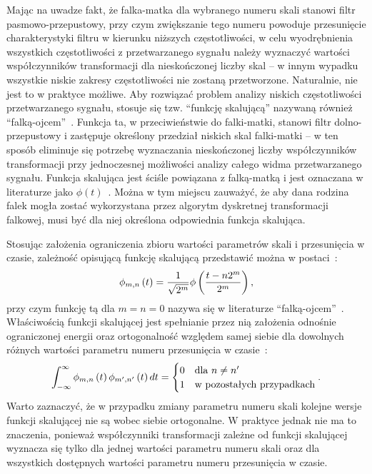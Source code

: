 Mając na uwadze fakt, że falka-matka dla wybranego numeru skali stanowi filtr pasmowo-przepustowy, przy czym zwiększanie tego numeru powoduje przesunięcie charakterystyki filtru w kierunku niższych częstotliwości, w celu wyodrębnienia wszystkich częstotliwości z przetwarzanego sygnału należy wyznaczyć wartości współczynników transformacji dla nieskończonej liczby skal -- w innym wypadku wszystkie niskie zakresy częstotliwości nie zostaną przetworzone. Naturalnie, nie jest to w praktyce możliwe. Aby rozwiązać problem analizy niskich częstotliwości przetwarzanego sygnału, stosuje się tzw. \enquote{funkcję skalującą} nazywaną również \enquote{falką-ojcem}~\cite{shensa_dwt}. Funkcja ta, w przeciwieństwie do falki-matki, stanowi filtr dolno-przepustowy i zastępuje określony przedział niskich skal falki-matki -- w ten sposób eliminuje się potrzebę wyznaczania nieskończonej liczby współczynników transformacji przy jednoczesnej możliwości analizy całego widma przetwarzanego sygnału. Funkcja skalująca jest ściśle powiązana z falką-matką i jest oznaczana w literaturze jako $\phi(t)$~\cite{wallen_handbook}. Można w tym miejscu zauważyć, że aby dana rodzina falek mogła zostać wykorzystana przez algorytm dyskretnej transformacji falkowej, musi być dla niej określona odpowiednia funkcja skalująca.

Stosując założenia ograniczenia zbioru wartości parametrów skali i przesunięcia w czasie, zależność opisującą funkcję skalującą przedstawić można w postaci~\cite{ahmad_wavelet}:
\begin{equation}
\phi_{m,n} \left(t\right) = \frac{1}{\sqrt{2^{m}}} \phi \left(\frac{t - n 2^{m}}{2^{m}}\right) \label{eq:dwt_scalefun},
\end{equation}
przy czym funkcję tą dla $m = n = 0$ nazywa się w literaturze \enquote{falką-ojcem}~\cite{akujuobi_applications}. Właściwością funkcji skalującej jest spełnianie przez nią założenia odnośnie ograniczonej energii oraz ortogonalność względem samej siebie dla dowolnych różnych wartości parametru numeru przesunięcia w czasie~\cite{ahmad_wavelet}:
\begin{equation}
\int _{-\infty} ^{\infty} \phi_{m,n} \emb{t} \phi_{m',n'} \emb{t} dt =
\begin{cases}
	0 & $dla $ n \ne n' \\
	1 & $w pozostałych przypadkach$
\end{cases}
\label{eq:dwt_orthogonal_father}.
\end{equation}
Warto zaznaczyć, że w przypadku zmiany parametru numeru skali kolejne wersje funkcji skalującej nie są wobec siebie ortogonalne. W praktyce jednak nie ma to znaczenia, ponieważ współczynniki transformacji zależne od funkcji skalującej wyznacza się tylko dla jednej wartości parametru numeru skali oraz dla wszystkich dostępnych wartości parametru numeru przesunięcia w czasie.

